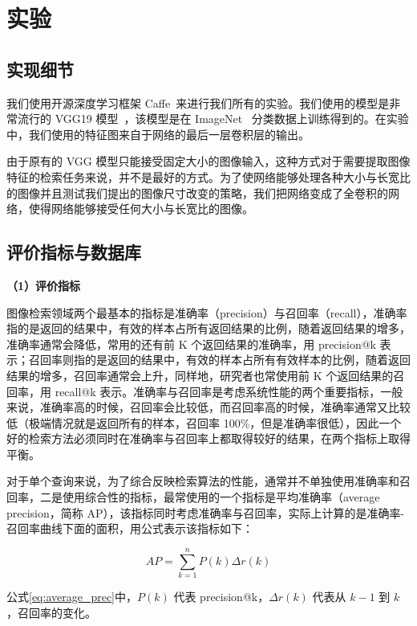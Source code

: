 \section{实验}\label{sec:mfc_experiment}
\subsection{实现细节}
我们使用开源深度学习框架 Caffe~\cite{Jia2014CaffeCA}来进行我们所有的实验。我们使用的模型是非常流行的 VGG19 模型~\cite{Simonyan2014VeryDC}，该模型是在 ImageNet~\cite{Russakovsky2015ImageNetLS} 分类数据上训练得到的。在实验中，我们使用的特征图来自于网络的最后一层卷积层的输出。

由于原有的 VGG 模型只能接受固定大小的图像输入，这种方式对于需要提取图像特征的检索任务来说，并不是最好的方式。为了使网络能够处理各种大小与长宽比的图像并且测试我们提出的图像尺寸改变的策略，我们把网络变成了全卷积的网络，使得网络能够接受任何大小与长宽比的图像。

\subsection{评价指标与数据库}

\noindent\textbf{（1）评价指标}

图像检索领域两个最基本的指标是准确率（precision）与召回率（recall），准确率指的是返回的结果中，有效的样本占所有返回结果的比例，随着返回结果的增多，准确率通常会降低，常用的还有前 K 个返回结果的准确率，用 precision@k 表示；召回率则指的是返回的结果中，有效的样本占所有有效样本的比例，随着返回结果的增多，召回率通常会上升，同样地，研究者也常使用前 K 个返回结果的召回率，用 recall@k 表示。准确率与召回率是考虑系统性能的两个重要指标，一般来说，准确率高的时候，召回率会比较低，而召回率高的时候，准确率通常又比较低（极端情况就是返回所有的样本，召回率 100\%，但是准确率很低），因此一个好的检索方法必须同时在准确率与召回率上都取得较好的结果，在两个指标上取得平衡。

对于单个查询来说，为了综合反映检索算法的性能，通常并不单独使用准确率和召回率，二是使用综合性的指标，最常使用的一个指标是平均准确率（average precision，简称 AP），该指标同时考虑准确率与召回率，实际上计算的是准确率-召回率曲线下面的面积，用公式表示该指标如下：

\begin{equation}\label{eq:average_prec}
AP = \sum_{k=1}^{n}P(k)\Delta r(k)
\end{equation}

公式\ref{eq:average_prec}中，$P(k)$ 代表 precision@k，$\Delta r(k)$ 代表从 $k-1$ 到 $k$，召回率的变化。

